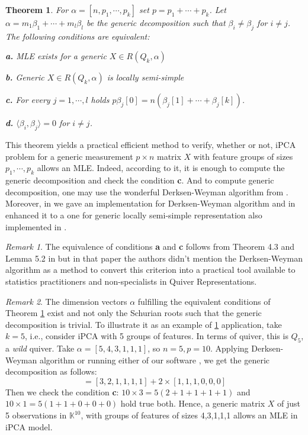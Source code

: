 \documentclass[reqno]{amsart}
\theoremstyle{plain}
\newtheorem{theorem}{Theorem}[section]
\theoremstyle{definition}
\theoremstyle{remark}
\newtheorem{remark}{Remark}[section]
\begin{document}
\begin{theorem}\label{main_result}
For  $\alpha=[n,p_1,\cdots,p_k]$ set $p=p_1+\cdots+p_k$. Let $\alpha=m_1\beta_1+\cdots+m_l\beta_l$ be the generic decomposition such that $\beta_i\neq \beta_j$ for $i\neq j$. The following conditions are equivalent:

{\bf a.} MLE exists for a generic $X\in R(Q_k,\alpha)$

{\bf b.} Generic $X\in R(Q_k,\alpha)$ is locally semi-simple

{\bf c.} For every $j=1,\cdots,l$ holds $p\beta_j[0]=n(\beta_j[1]+\cdots+\beta_j[k])$.

{\bf d.}  $\langle \beta_i,\beta_j\rangle=0$ for $i\neq j$.
\end{theorem}

This theorem yields a practical efficient method to verify, whether or not, iPCA problem for a
generic measurement $p\times n$ matrix $X$ with feature groups of sizes $p_1,\cdots,p_k$ allows an MLE. Indeed, according to it, it is enough to compute the generic decomposition and check the condition {\bf c}. And to compute generic decomposition, one may use the wonderful Derksen-Weyman algorithm from \cite{dw}. Moreover, in \cite{t} we gave an
implementation for Derksen-Weyman algorithm and in  \cite{sh09} enhanced it to a one for generic locally semi-simple representation also implemented in \cite{t}.

\begin{remark} The equivalence of conditions {\bf a} and {\bf c} follows from Theorem 4.3 and Lemma 5.2 in \cite{fm} but in that paper the authors didn't mention the Derksen-Weyman algorithm  as a method to convert this criterion into a practical tool available to statistics practitioners and non-specialists in Quiver Representations.
\end{remark}
\begin{remark}
The dimension vectors $\alpha$ fulfilling the equivalent conditions of Theorem \ref{main_result} exist and not only the Schurian roots such that the generic decomposition is trivial. To illustrate it as an example of \ref{main_result} application, take $k=5$, i.e., consider iPCA with 5 groups of features. In terms of quiver, this is  $Q_5$, a {\it wild} quiver. Take $\alpha=[5,4,3,1,1,1]$, so $n=5,p=10$. Applying Derksen-Weyman algorithm \cite{dw} or running either of our software  \cite{t},\cite{ff} we get the generic decomposition as follows:
\begin{equation}
[5,4,3,1,1,1]=[3,2,1,1,1,1]+2\times[1,1,1,0,0,0]
\end{equation}
Then we check the condition {\bf c}: $10\times 3= 5(2+1+1+1+1)$ and  $10\times 1= 5(1+1+0+0+0)$ hold true both. Hence, a generic  matrix $X$ of just 5 observations in ${\mathbb K}^{10}$, with groups of features of sizes 4,3,1,1,1 allows an MLE in iPCA model.
\end{remark}
\end{document}
